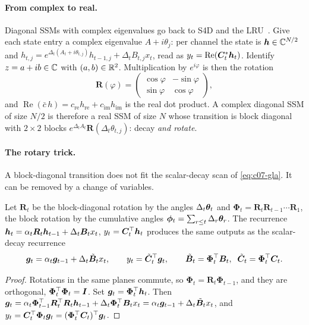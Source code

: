 \paragraph{From complex to real.} Diagonal SSMs with complex eigenvalues go back to
S4D and the LRU~\citep{c07-gu2022s4d,c07-orvieto2023lru}. Give each state entry a complex
eigenvalue $A + i\theta_j$: per channel the state is $\bm{h}\in\mathbb{C}^{N/2}$ and
$h_{t,j} = e^{\Delta_t(A_t + i\theta_{t,j})}h_{t-1,j} + \Delta_tB_{t,j}x_t$, read as
$y_t = \operatorname{Re}(\bm{C}_t^{*}\bm{h}_t)$. Identify $z = a + ib\in\mathbb{C}$ with $(a,b)\in\mathbb{R}^2$.
Multiplication by $e^{i\varphi}$ is then the rotation
\[
  \bm{R}(\varphi) = \begin{pmatrix}\cos\varphi & -\sin\varphi\\ \sin\varphi & \cos\varphi\end{pmatrix},
\]
and $\operatorname{Re}(\bar c\,h) = c_{\mathrm{re}}h_{\mathrm{re}} + c_{\mathrm{im}}h_{\mathrm{im}}$ is
the real dot product. A complex diagonal SSM of size $N/2$ is therefore a real SSM of size
$N$ whose transition is block diagonal with $2\times2$ blocks
$e^{\Delta_tA_t}\bm{R}(\Delta_t\theta_{t,j})$: decay \emph{and rotate}.

\paragraph{The rotary trick.} A block-diagonal transition does not fit the scalar-decay scan of
\cref{eq:c07-gla}. It can be removed by a change of variables.

\begin{proposition}\label{prop:c07-rope}
Let $\bm{R}_t$ be the block-diagonal rotation by the angles $\Delta_t\bm{\theta}_t$ and
$\bm\Phi_t = \bm{R}_t\bm{R}_{t-1}\cdots\bm{R}_1$, the block rotation by the cumulative angles
$\bm{\phi}_t = \sum_{r\le t}\Delta_r\bm{\theta}_r$. The recurrence
$\bm{h}_t = \alpha_t\bm{R}_t\bm{h}_{t-1} + \Delta_t\bm{B}_tx_t$, $y_t = \bm{C}_t^{\top}\bm{h}_t$ produces the same
outputs as the scalar-decay recurrence
\[
  \bm{g}_t = \alpha_t\bm{g}_{t-1} + \Delta_t\tilde{\bm{B}}_tx_t,\qquad y_t = \tilde{\bm{C}}_t^{\top}\bm{g}_t,\qquad
  \tilde{\bm{B}}_t = \bm\Phi_t^{\top}\bm{B}_t,\;\; \tilde{\bm{C}}_t = \bm\Phi_t^{\top}\bm{C}_t .
\]
\end{proposition}
\begin{proof}
Rotations in the same planes commute, so $\bm\Phi_t = \bm{R}_t\bm\Phi_{t-1}$, and they are
orthogonal, $\bm\Phi_t^{\top}\bm\Phi_t = \bm{I}$. Set $\bm{g}_t = \bm\Phi_t^{\top}\bm{h}_t$. Then
$\bm{g}_t = \alpha_t\bm\Phi_{t-1}^{\top}\bm{R}_t^{\top}\bm{R}_t\bm{h}_{t-1} + \Delta_t\bm\Phi_t^{\top}\bm{B}_tx_t
= \alpha_t\bm{g}_{t-1} + \Delta_t\tilde{\bm{B}}_tx_t$, and
$y_t = \bm{C}_t^{\top}\bm\Phi_t\bm{g}_t = (\bm\Phi_t^{\top}\bm{C}_t)^{\top}\bm{g}_t$.
\end{proof}

